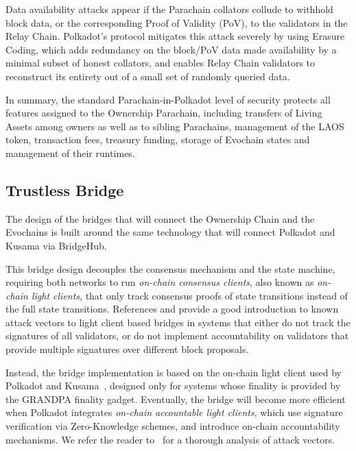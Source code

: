 Data availability attacks appear if the Parachain collators collude to 
withhold block data, or the corresponding Proof of Validity (PoV), to the 
validators in the Relay Chain. 
Polkadot's protocol mitigates this 
attack severely by using Erasure Coding\cite{al2018fraud}, which
adds redundancy on the block/PoV data 
made availability by a minimal subset of honest collators, and enables Relay Chain
validators to reconstruct its entirety out
of a small set of randomly queried data.

In summary, the standard Parachain-in-Polkadot level of security 
protects all features assigned to the Ownership Parachain,
including transfers of Living Assets among owners as well as to
sibling Parachains, management of the LAOS token, 
transaction fees, treasury funding, storage of Evochain states and 
management of their runtimes.

\subsection{Trustless Bridge}\label{sec:security-bridge}

The design of the bridges that will connect the Ownership Chain 
and the Evochains is built around the same technology that 
will connect Polkadot and Kusama via BridgeHub\cite{bridgehub}.

This bridge design decouples the consensus mechanism
and the state machine, requiring both networks to run 
{\it on-chain consensus clients}, also known as {\it on-chain light clients},
that only track consensus proofs of state
transitions instead of the full state transitions.
References \cite{SeunLanlege} and \cite{snowfork} provide a good introduction to 
known attack vectors to light client based bridges in systems
that either do not track the signatures of all validators, or do 
not implement accountability on validators that provide multiple signatures
over different block proposals. 

Instead, the bridge implementation is based on the on-chain light
client used by Polkadot and Kusama~\cite{parity-bridges}, 
designed only for systems whose finality is provided by the GRANDPA finality gadget.
Eventually, the bridge will become more efficient when Polkadot integrates
{\it on-chain accountable light clients}, which use signature
verification via Zero-Knowledge schemes, and introduce on-chain
accountability mechanisms. We refer the reader to~\cite{ciobotaru2022accountable}
for a thorough analysis of attack vectors.

